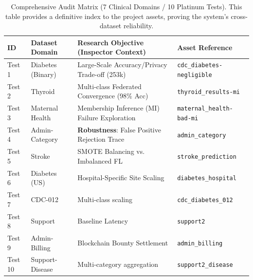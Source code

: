 \documentclass[10pt, a4paper, twocolumn]{article}
\begin{document}
\begin{table}[hbt!]
\centering
\scriptsize
\begin{tabular}{lp{2.5cm}p{5.5cm}l}
\toprule
\textbf{ID} & \textbf{Dataset Domain} & \textbf{Research Objective (Inspector Context)} & \textbf{Asset Reference} \\
\midrule
Test 1 & Diabetes (Binary) & Large-Scale Accuracy/Privacy Trade-off (253k) & \texttt{cdc\_diabetes-negligible} \\
Test 2 & Thyroid & Multi-class Federated Convergence (98\% Acc) & \texttt{thyroid\_results-mi} \\
Test 3 & Maternal Health & Membership Inference (MI) Failure Exploration & \texttt{maternal\_health-bad-mi} \\
Test 4 & Admin-Category & \textbf{Robustness}: False Positive Rejection Trace & \texttt{admin\_category} \\
Test 5 & Stroke & SMOTE Balancing vs. Imbalanced FL & \texttt{stroke\_prediction} \\
Test 6 & Diabetes (US) & Hospital-Specific Site Scaling & \texttt{diabetes\_hospital} \\
Test 7 & CDC-012 & Multi-class scaling & \texttt{cdc\_diabetes\_012} \\
Test 8 & Support & Baseline Latency & \texttt{support2} \\
Test 9 & Admin-Billing & Blockchain Bounty Settlement & \texttt{admin\_billing} \\
Test 10 & Support-Disease & Multi-category aggregation & \texttt{support2\_disease} \\
\bottomrule
\end{tabular}
\caption{Comprehensive Audit Matrix (7 Clinical Domains / 10 Platinum Tests). This table provides a definitive index to the project assets, proving the system's cross-dataset reliability.}
\end{table}
\end{document}
